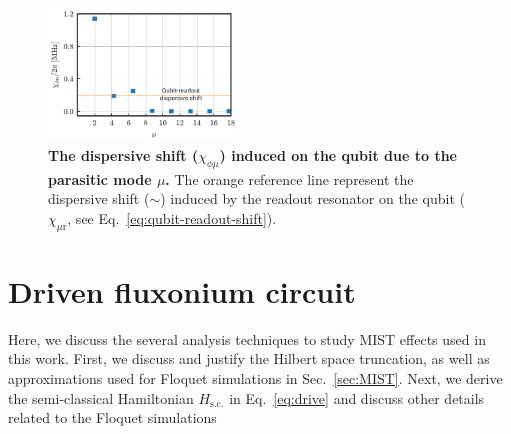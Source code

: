 \documentclass[%
reprint,
superscriptaddress,
 amsmath,amssymb,
 aps,
 prx,
longbibliography,
floatfix,
]{revtex4-2}
\begin{document}
\begin{figure}[t]
    \centering
    \includegraphics[width=0.45\textwidth]{Supp_Fig/dispersive_shift.pdf}
    \caption{ {\bf The dispersive shift ($\chi_{\phi\mu}$) induced on the qubit due to the parasitic mode $\mu$.} The orange reference line represent the dispersive shift ($\sim $) induced by the readout resonator on the qubit ($\chi_{\mu\textrm{r}}$, see Eq.~\ref{eq:qubit-readout-shift}).}
    \label{fig:dispersive-shift}
\end{figure}

\section{Driven fluxonium circuit}\label{app:MIST}
Here, we discuss the several analysis techniques to study MIST effects used in this work. First, we discuss and justify the Hilbert space truncation, as well as approximations used for Floquet simulations in Sec.~\ref{sec:MIST}. Next, we derive the semi-classical Hamiltonian $H_\textrm{s.c.}$ in Eq.~\ref{eq:drive} and discuss other details related to the Floquet simulations
\end{document}
